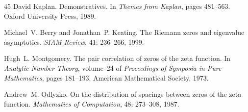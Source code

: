 \documentclass[11pt,a4paper]{article}
\theoremstyle{plain}
\theoremstyle{definition}
\theoremstyle{remark}
\begin{document}
\begin{thebibliography}{45}
David Kaplan.
\newblock Demonstratives.
\newblock In \emph{Themes from Kaplan}, pages 481--563. Oxford University
  Press, 1989.

Michael~V. Berry and Jonathan~P. Keating.
\newblock The {R}iemann zeros and eigenvalue asymptotics.
\newblock \emph{SIAM Review}, 41: 236--266, 1999.

Hugh~L. Montgomery.
\newblock The pair correlation of zeros of the zeta function.
\newblock In \emph{Analytic Number Theory}, volume~24 of \emph{Proceedings of
  Symposia in Pure Mathematics}, pages 181--193. American Mathematical Society,
  1973.

Andrew~M. Odlyzko.
\newblock On the distribution of spacings between zeros of the zeta function.
\newblock \emph{Mathematics of Computation}, 48: 273--308, 1987.

\end{thebibliography}

\end{document}
